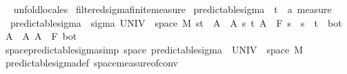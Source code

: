 \begin{isabellebody}
\ %
\endisadelimproof
%
\isatagproof
{}\isamarkupfalse%
\ {\isacharparenleft}{\kern0pt}unfold{\isacharunderscore}{\kern0pt}locales{\isacharparenright}{\kern0pt}%
\endisatagproof
{\isafoldproof}%
%
\isadelimproof
%
\endisadelimproof
%
\isadelimdocument
%
\endisadelimdocument
%
\isatagdocument
%
\isamarkuptrue%
%
\endisatagdocument
{\isafolddocument}%
%
\isadelimdocument
%
\endisadelimdocument
{}\isamarkupfalse%
\ filtered{\isacharunderscore}{\kern0pt}sigma{\isacharunderscore}{\kern0pt}finite{\isacharunderscore}{\kern0pt}measure\isanewline
{}\isanewline
\isanewline
{}\isamarkupfalse%
\ predictable{\isacharunderscore}{\kern0pt}sigma\ {\isacharcolon}{\kern0pt}{\isacharcolon}{\kern0pt}\ {\isachardoublequoteopen}{\isacharparenleft}{\kern0pt}{\isacharprime}{\kern0pt}t\ {\isasymtimes}\ {\isacharprime}{\kern0pt}a{\isacharparenright}{\kern0pt}\ measure{\isachardoublequoteclose}\ \isanewline
\ \ {\isachardoublequoteopen}predictable{\isacharunderscore}{\kern0pt}sigma\ {\isacharequal}{\kern0pt}\ sigma\ {\isacharparenleft}{\kern0pt}UNIV\ {\isasymtimes}\ space\ M{\isacharparenright}{\kern0pt}\ {\isacharparenleft}{\kern0pt}{\isacharbraceleft}{\kern0pt}{\isacharbraceleft}{\kern0pt}s{\isacharless}{\kern0pt}{\isachardot}{\kern0pt}{\isachardot}{\kern0pt}t{\isacharbraceright}{\kern0pt}\ {\isasymtimes}\ A\ {\isacharbar}{\kern0pt}\ A\ s\ t{\isachardot}{\kern0pt}\ A\ {\isasymin}\ F\ s\ {\isasymand}\ s\ {\isacharless}{\kern0pt}\ t{\isacharbraceright}{\kern0pt}\ {\isasymunion}\ {\isacharbraceleft}{\kern0pt}{\isacharbraceleft}{\kern0pt}bot{\isacharbraceright}{\kern0pt}\ {\isasymtimes}\ A\ {\isacharbar}{\kern0pt}\ A{\isachardot}{\kern0pt}\ A\ {\isasymin}\ F\ bot{\isacharbraceright}{\kern0pt}{\isacharparenright}{\kern0pt}{\isachardoublequoteclose}\isanewline
\isanewline
{}\isamarkupfalse%
\ space{\isacharunderscore}{\kern0pt}predictable{\isacharunderscore}{\kern0pt}sigma{\isacharbrackleft}{\kern0pt}simp{\isacharbrackright}{\kern0pt}{\isacharcolon}{\kern0pt}\ {\isachardoublequoteopen}space\ predictable{\isacharunderscore}{\kern0pt}sigma\ {\isacharequal}{\kern0pt}\ {\isacharparenleft}{\kern0pt}UNIV\ {\isasymtimes}\ space\ M{\isacharparenright}{\kern0pt}{\isachardoublequoteclose}%
\isadelimproof
\ %
\endisadelimproof
%
\isatagproof
{}\isamarkupfalse%
\ predictable{\isacharunderscore}{\kern0pt}sigma{\isacharunderscore}{\kern0pt}def\ space{\isacharunderscore}{\kern0pt}measure{\isacharunderscore}{\kern0pt}of{\isacharunderscore}{\kern0pt}conv\ \isamarkupfalse%

\end{isabellebody}
